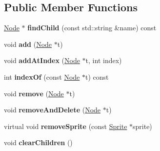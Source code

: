 \subsection*{Public Member Functions}
\begin{DoxyCompactItemize}
\item 
\hypertarget{classg2c_1_1_node_aa6d5ce9f6bff259d79c34a6923ab7e18}{
\hyperlink{classg2c_1_1_node}{Node} $\ast$ {\bfseries findChild} (const std::string \&name) const }
\label{classg2c_1_1_node_aa6d5ce9f6bff259d79c34a6923ab7e18}

\item 
\hypertarget{classg2c_1_1_node_a698332ea09f276a296102e1645de3fc4}{
void {\bfseries add} (\hyperlink{classg2c_1_1_node}{Node} $\ast$t)}
\label{classg2c_1_1_node_a698332ea09f276a296102e1645de3fc4}

\item 
\hypertarget{classg2c_1_1_node_af9960ae3bfbb5a116667bb0a1aeffd7f}{
void {\bfseries addAtIndex} (\hyperlink{classg2c_1_1_node}{Node} $\ast$t, int index)}
\label{classg2c_1_1_node_af9960ae3bfbb5a116667bb0a1aeffd7f}

\item 
\hypertarget{classg2c_1_1_node_ae3485a8c3dfb0bd397aff4d283964498}{
int {\bfseries indexOf} (const \hyperlink{classg2c_1_1_node}{Node} $\ast$t) const }
\label{classg2c_1_1_node_ae3485a8c3dfb0bd397aff4d283964498}

\item 
\hypertarget{classg2c_1_1_node_a56f487a49b2221469568ea8587645e51}{
void {\bfseries remove} (\hyperlink{classg2c_1_1_node}{Node} $\ast$t)}
\label{classg2c_1_1_node_a56f487a49b2221469568ea8587645e51}

\item 
\hypertarget{classg2c_1_1_node_a8745619ad7458808da226105aa12d08c}{
void {\bfseries removeAndDelete} (\hyperlink{classg2c_1_1_node}{Node} $\ast$t)}
\label{classg2c_1_1_node_a8745619ad7458808da226105aa12d08c}

\item 
\hypertarget{classg2c_1_1_node_ac660db669518df6974163453edc8cb49}{
virtual void {\bfseries removeSprite} (const \hyperlink{classg2c_1_1_sprite}{Sprite} $\ast$sprite)}
\label{classg2c_1_1_node_ac660db669518df6974163453edc8cb49}

\item 
\hypertarget{classg2c_1_1_node_a138ae78f70f933cbee525f2891b3ab97}{
void {\bfseries clearChildren} ()}
\label{classg2c_1_1_node_a138ae78f70f933cbee525f2891b3ab97}


\end{DoxyCompactItemize}
